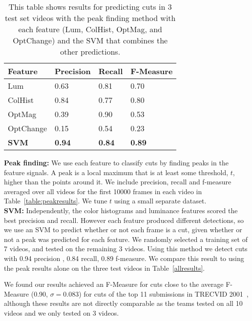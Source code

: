 \begin{table}[h!]
  \begin{center}
  	\small{
	\begin{tabular}{l|lll}
	Feature   & Precision  & Recall     & F-Measure  \\ \hline
	Lum       & 0.63      & 0.81   & 0.70      \\
	ColHist   & 0.84      & 0.77   & 0.80      \\
	OptMag    & 0.39      & 0.90   & 0.53      \\
	OptChange & 0.15      & 0.54   & 0.23      \\
	\textbf{SVM} & \textbf{0.94} & \textbf{0.84} & \textbf{0.89}\\ \hline
	\end{tabular}
	}
  \end{center}
  \label{table:allresults}
  \caption{This table shows results for predicting cuts in 3 test set videos with the peak finding method with each feature (Lum, ColHist, OptMag, and OptChange) and the SVM that combines the other predictions.}
\end{table} 

\noindent \textbf{Peak finding:} We use each feature to classify cuts by finding peaks in the feature signals. A peak is a local maximum that is at least some threshold, $t$, higher than the points around it. We include precision, recall and f-measure averaged over all videos for the first 10000 frames in each video in Table~\ref{table:peakresults}. We tune $t$ using a small separate dataset.\\

\noindent \textbf{SVM:} Independently, the color histograms and luminance features scored the best precision and recall. However each feature produced different detections, so we use an SVM to predict whether or not each frame is a cut, given whether or not a peak was predicted for each feature. We randomly selected a training set of 7 videos, and tested on the remaining 3 videos. Using this method we detect cuts with 0.94 precision , 0.84 recall, 0.89 f-measure. We compare this result to using the peak results alone on the three test videos in Table~\ref{allresults}. 

We found our results achieved an F-Measure for cuts close to the average F-Measure (0.90, $\sigma = 0.083$) for cuts of the top 11 submissions in TRECVID 2001~\cite{quenot2001trec}, although these results are not directly comparable as the teams tested on all 10 videos and we only tested on 3 videos. 

